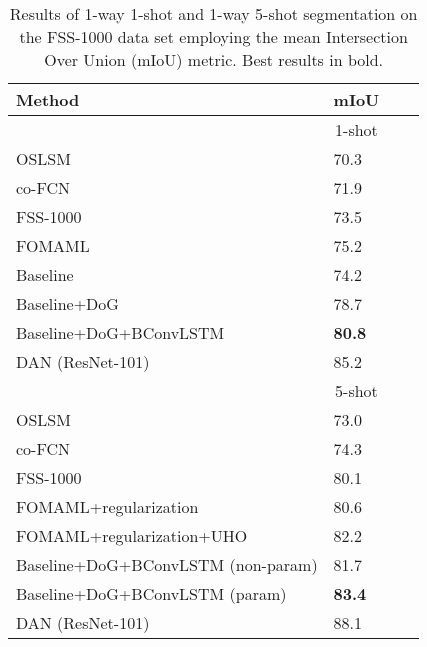 \documentclass[runningheads]{llncs}
\begin{document}
\begin{table}[h!]
\scriptsize
\begin{center}
\caption{Results of 1-way 1-shot and 1-way 5-shot segmentation on the FSS-1000 data set employing the mean Intersection Over Union (mIoU) metric. Best results in bold.}
\label{table:headings}
\begin{tabular}{llcc}
\hline\noalign{\smallskip}
 Method & mIoU\\
\hline
& \multicolumn{1}{c}{1-shot}  \\
\hline
\noalign{\smallskip}
OSLSM \cite{shaban2017one} & 70.3 \\
co-FCN \cite{rakelly2018conditional} & 71.9 \\
FSS-1000 \cite{wei2019fss} & 73.5 \\
FOMAML \cite{hendryx2019meta} & 75.2 \\
Baseline  & 74.2 \\
Baseline+DoG & 78.7 \\
Baseline+DoG+BConvLSTM  & \bf 80.8 \\
\hline
DAN \cite{wangfew} (ResNet-101) & 85.2 \\
\hline
& \multicolumn{1}{c}{5-shot}  \\
\hline\noalign{\smallskip}
OSLSM \cite{shaban2017one} & 73.0\\
co-FCN \cite{rakelly2018conditional} & 74.3\\
FSS-1000 \cite{wei2019fss} & 80.1\\
FOMAML+regularization \cite{hendryx2019meta} &80.6 \\
FOMAML+regularization+UHO \cite{hendryx2019meta} & 82.2 \\
Baseline+DoG+BConvLSTM (non-param) & 81.7 \\
Baseline+DoG+BConvLSTM (param) & \bf 83.4 \\
\hline
DAN \cite{wangfew} (ResNet-101) & 88.1 \\
\hline

\end{tabular}
\label{table:1000Class}
\end{center}
\vspace{-6mm}
\end{table}
\end{document}
